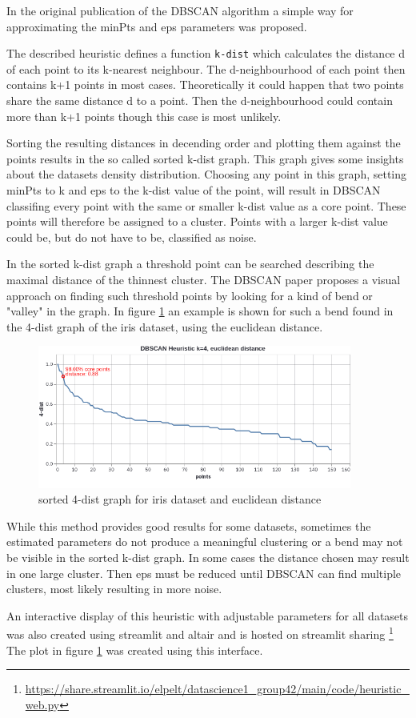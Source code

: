 In the original publication of the DBSCAN algorithm \cite{dbscan} a simple way for approximating the minPts and eps parameters was proposed.

The described heuristic defines a function \texttt{k-dist} which calculates the distance d of each point to its k-nearest neighbour.
The d-neighbourhood of each point then contains k+1 points in most cases. Theoretically it could happen that two points share the same distance d to a point. Then the d-neighbourhood could contain more than k+1 points though this case is most unlikely.

Sorting the resulting distances in decending order and plotting them against the points results in the so called sorted k-dist graph. This graph gives some insights about the datasets density distribution. Choosing any point in this graph, setting minPts to k and eps to the k-dist value of the point, will result in DBSCAN classifing every point with the same or smaller k-dist value as a core point. These points will therefore be assigned to a cluster. Points with a larger k-dist value could be, but do not have to be, classified as noise. 

In the sorted k-dist graph a threshold point can be searched describing the maximal distance of the thinnest cluster. The DBSCAN paper \cite{dbscan} proposes a visual approach on finding such threshold points by looking for a kind of bend or "valley" in the graph. 
In figure \ref{fig:sorteddistgraphiriseucl} an example is shown for such a bend found in the 4-dist graph of the iris dataset, using the euclidean distance.

\begin{figure}
    \includegraphics[width=0.92\textwidth]{../plots/dbscan/iris_4dist_euclidean}
    \caption{sorted 4-dist graph for iris dataset and euclidean distance}
    \label{fig:sorteddistgraphiriseucl}
\end{figure}

While this method provides good results for some datasets, sometimes the estimated parameters do not produce a meaningful clustering or a bend may not be visible in the sorted k-dist graph. In some cases the distance chosen may result in one large cluster. Then eps must be reduced until DBSCAN can find multiple clusters, most likely resulting in more noise.

An interactive display of this heuristic with adjustable parameters for all datasets was also created using streamlit and altair and is hosted on streamlit sharing 
\footnote{\scriptsize\url{https://share.streamlit.io/elpelt/datascience1_group42/main/code/heuristic_web.py}}
The plot in figure \ref{fig:sorteddistgraphiriseucl} was created using this interface.
